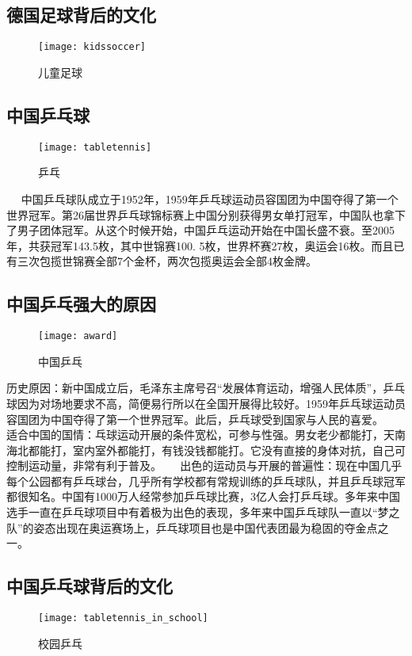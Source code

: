 \subsection{德国足球背后的文化}
\begin{figure}[htb]
    \centering
    \texttt{[image: kidssoccer]}
    \caption{儿童足球}
\end{figure}

\subsection{中国乒乓球}
\begin{figure}[htb]
    \centering
    \texttt{[image: tabletennis]}
    \caption{乒乓}
\end{figure}

    中国乒乓球队成立于1952年，1959年乒乓球运动员容国团为中国夺得了第一个世界冠军。第26届世界乒乓球锦标赛上中国分别获得男女单打冠军，中国队也拿下了男子团体冠军。从这个时候开始，中国乒乓运动开始在中国长盛不衰。至2005年，共获冠军143.5枚，其中世锦赛100. 5枚，世界杯赛27枚，奥运会16枚。而且已有三次包揽世锦赛全部7个金杯，两次包揽奥运会全部4枚金牌。

\subsection{中国乒乓强大的原因}
\begin{figure}[htb]
    \centering
    \texttt{[image: award]}
    \caption{中国乒乓}
\end{figure}

    历史原因：新中国成立后，毛泽东主席号召“发展体育运动，增强人民体质”，乒乓球因为对场地要求不高，简便易行所以在全国开展得比较好。1959年乒乓球运动员容国团为中国夺得了第一个世界冠军。此后，乒乓球受到国家与人民的喜爱。 
    适合中国的国情：乓球运动开展的条件宽松，可参与性强。男女老少都能打，天南海北都能打，室内室外都能打，有钱没钱都能打。它没有直接的身体对抗，自己可控制运动量，非常有利于普及。 
    出色的运动员与开展的普遍性：现在中国几乎每个公园都有乒乓球台，几乎所有学校都有常规训练的乒乓球队，并且乒乓球冠军都很知名。中国有1000万人经常参加乒乓球比赛，3亿人会打乒乓球。多年来中国选手一直在乒乓球项目中有着极为出色的表现，多年来中国乒乓球队一直以“梦之队”的姿态出现在奥运赛场上，乒乓球项目也是中国代表团最为稳固的夺金点之一。

\subsection{中国乒乓球背后的文化}
\begin{figure}[htb]
    \centering
    \texttt{[image: tabletennis\_in\_school]}
    \caption{校园乒乓}
\end{figure}

